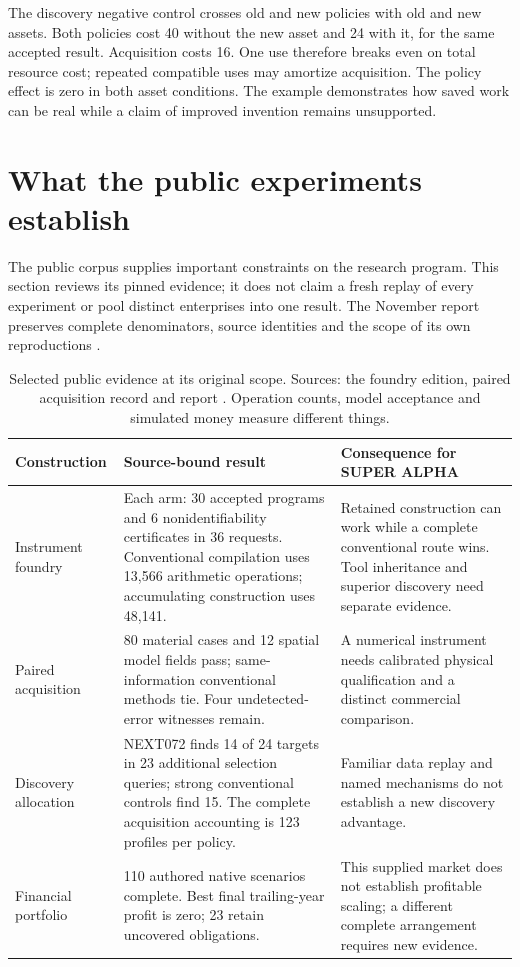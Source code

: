 \documentclass[11pt,letterpaper]{article}
\begin{document}
The discovery negative control crosses old and new policies with old and new assets. Both policies cost 40 without the new asset and 24 with it, for the same accepted result. Acquisition costs 16. One use therefore breaks even on total resource cost; repeated compatible uses may amortize acquisition. The policy effect is zero in both asset conditions. The example demonstrates how saved work can be real while a claim of improved invention remains unsupported.

\FloatBarrier
\section{What the public experiments establish}
The public corpus supplies important constraints on the research program. This section reviews its pinned evidence; it does not claim a fresh replay of every experiment or pool distinct enterprises into one result. The November report preserves complete denominators, source identities and the scope of its own reproductions \cite{report20261102}.

\begin{table}[htbp]\centering\small
\begin{tabularx}{\linewidth}{@{}P{3.0cm}YY@{}}\toprule
Construction & Source-bound result & Consequence for SUPER ALPHA\\\midrule
Instrument foundry & Each arm: 30 accepted programs and 6 nonidentifiability certificates in 36 requests. Conventional compilation uses 13,566 arithmetic operations; accumulating construction uses 48,141. & Retained construction can work while a complete conventional route wins. Tool inheritance and superior discovery need separate evidence.\\
Paired acquisition & 80 material cases and 12 spatial model fields pass; same-information conventional methods tie. Four undetected-error witnesses remain. & A numerical instrument needs calibrated physical qualification and a distinct commercial comparison.\\
Discovery allocation & NEXT072 finds 14 of 24 targets in 23 additional selection queries; strong conventional controls find 15. The complete acquisition accounting is 123 profiles per policy. & Familiar data replay and named mechanisms do not establish a new discovery advantage.\\
Financial portfolio & 110 authored native scenarios complete. Best final trailing-year profit is zero; 23 retain uncovered obligations. & This supplied market does not establish profitable scaling; a different complete arrangement requires new evidence.\\\bottomrule
\end{tabularx}
\caption{Selected public evidence at its original scope. Sources: the foundry edition, paired acquisition record and report \cite{flywheel11,paired,report20261102,r2}. Operation counts, model acceptance and simulated money measure different things.}\label{tab:public}
\end{table}
\end{document}
